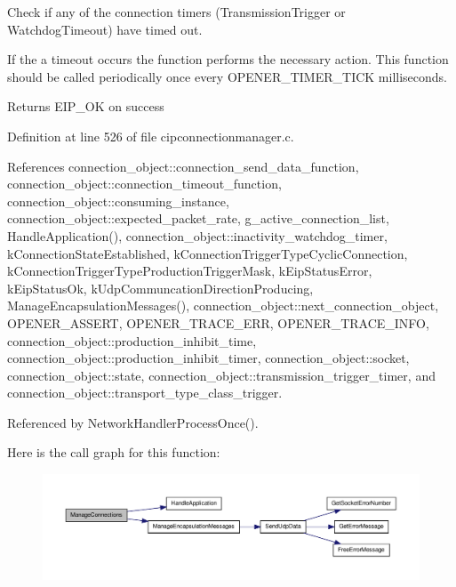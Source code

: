 \-Check if any of the connection timers (\-Transmission\-Trigger or \-Watchdog\-Timeout) have timed out. 

\-If the a timeout occurs the function performs the necessary action. \-This function should be called periodically once every \-O\-P\-E\-N\-E\-R\-\_\-\-T\-I\-M\-E\-R\-\_\-\-T\-I\-C\-K milliseconds.

\begin{DoxyReturn}{\-Returns}
\-E\-I\-P\-\_\-\-O\-K on success 
\end{DoxyReturn}


\-Definition at line 526 of file cipconnectionmanager.\-c.



\-References connection\-\_\-object\-::connection\-\_\-send\-\_\-data\-\_\-function, connection\-\_\-object\-::connection\-\_\-timeout\-\_\-function, connection\-\_\-object\-::consuming\-\_\-instance, connection\-\_\-object\-::expected\-\_\-packet\-\_\-rate, g\-\_\-active\-\_\-connection\-\_\-list, \-Handle\-Application(), connection\-\_\-object\-::inactivity\-\_\-watchdog\-\_\-timer, k\-Connection\-State\-Established, k\-Connection\-Trigger\-Type\-Cyclic\-Connection, k\-Connection\-Trigger\-Type\-Production\-Trigger\-Mask, k\-Eip\-Status\-Error, k\-Eip\-Status\-Ok, k\-Udp\-Communcation\-Direction\-Producing, \-Manage\-Encapsulation\-Messages(), connection\-\_\-object\-::next\-\_\-connection\-\_\-object, \-O\-P\-E\-N\-E\-R\-\_\-\-A\-S\-S\-E\-R\-T, \-O\-P\-E\-N\-E\-R\-\_\-\-T\-R\-A\-C\-E\-\_\-\-E\-R\-R, \-O\-P\-E\-N\-E\-R\-\_\-\-T\-R\-A\-C\-E\-\_\-\-I\-N\-F\-O, connection\-\_\-object\-::production\-\_\-inhibit\-\_\-time, connection\-\_\-object\-::production\-\_\-inhibit\-\_\-timer, connection\-\_\-object\-::socket, connection\-\_\-object\-::state, connection\-\_\-object\-::transmission\-\_\-trigger\-\_\-timer, and connection\-\_\-object\-::transport\-\_\-type\-\_\-class\-\_\-trigger.



\-Referenced by \-Network\-Handler\-Process\-Once().



\-Here is the call graph for this function\-:
\nopagebreak
\begin{figure}[H]
\begin{center}
\leavevmode
\includegraphics[width=350pt]{d2/dc9/group__CIP__API_ga9f57b09260efb5bfb188b9d0ca0c6091_cgraph}
\end{center}
\end{figure}




